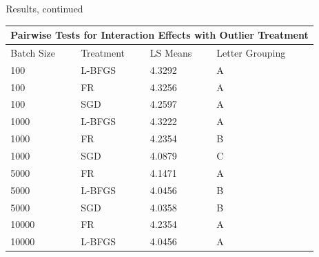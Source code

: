 \documentclass[final]{beamer}
\newlength{\sepwidth}
\newlength{\colwidth}
\newcommand{\separatorcolumn}{\begin{column}{\sepwidth}\end{column}}
\begin{document}
\begin{frame}[t]
\begin{columns}[t]
    \separatorcolumn

    \begin{column}{\colwidth}
      \begin{block}{Results, continued}
        \begin{table}[]
          \begin{tabular}{|llll|}
            \hline
            \multicolumn{4}{|c|}{\textbf{Pairwise Tests for Interaction Effects with Outlier Treatment}}                        \\ \hline
            \multicolumn{1}{|l|}{Batch Size} & \multicolumn{1}{l|}{Treatment} & \multicolumn{1}{l|}{LS Means} & Letter Grouping \\ \hline
            \multicolumn{1}{|l|}{100}        & \multicolumn{1}{l|}{L-BFGS}    & \multicolumn{1}{l|}{4.3292}   & A               \\
            \multicolumn{1}{|l|}{100}        & \multicolumn{1}{l|}{FR}        & \multicolumn{1}{l|}{4.3256}   & A               \\
            \multicolumn{1}{|l|}{100}        & \multicolumn{1}{l|}{SGD}       & \multicolumn{1}{l|}{4.2597}   & A               \\ \hline
            \multicolumn{1}{|l|}{1000}       & \multicolumn{1}{l|}{L-BFGS}    & \multicolumn{1}{l|}{4.3222}   & A               \\
            \multicolumn{1}{|l|}{1000}       & \multicolumn{1}{l|}{FR}        & \multicolumn{1}{l|}{4.2354}   & B               \\
            \multicolumn{1}{|l|}{1000}       & \multicolumn{1}{l|}{SGD}       & \multicolumn{1}{l|}{4.0879}   & C               \\ \hline
            \multicolumn{1}{|l|}{5000}       & \multicolumn{1}{l|}{FR}        & \multicolumn{1}{l|}{4.1471}   & A               \\
            \multicolumn{1}{|l|}{5000}       & \multicolumn{1}{l|}{L-BFGS}    & \multicolumn{1}{l|}{4.0456}   & B               \\
            \multicolumn{1}{|l|}{5000}       & \multicolumn{1}{l|}{SGD}       & \multicolumn{1}{l|}{4.0358}   & B               \\ \hline
            \multicolumn{1}{|l|}{10000}      & \multicolumn{1}{l|}{FR}        & \multicolumn{1}{l|}{4.2354}   & A               \\
            \multicolumn{1}{|l|}{10000}      & \multicolumn{1}{l|}{L-BFGS}    & \multicolumn{1}{l|}{4.0456}   & A               \\

\end{tabular}
\end{table}
\end{block}
\end{column}
\end{columns}
\end{frame}
\end{document}
